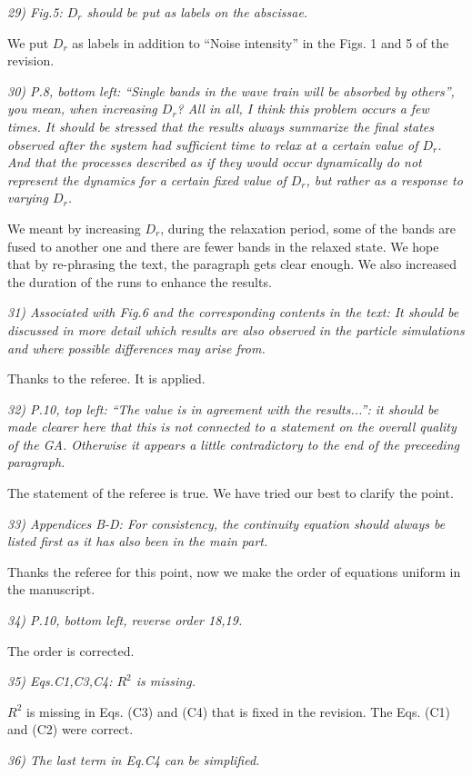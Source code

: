 \documentclass[a4paper,11pt]{letter}
\newcommand{\rf}[1]{\textit{\textcolor{hlcolor}{#1}}}
\begin{document}
\rf{29) Fig.5: $D_r$ should be put as labels on the abscissae.}

We put $D_r$ as labels in addition to ``Noise intensity'' in the Figs. 1 and 5 of the revision.

\rf{30) P.8, bottom left: ``Single bands in the wave train will be absorbed by others'', you mean, when increasing $D_r$? All in all, I think this problem occurs a few times. It should be stressed that the results always summarize the final states observed after the system had sufficient time to relax at a certain value of $D_r$. And that the processes described as if they would occur dynamically do not represent the dynamics for a certain fixed value of $D_r$, but rather as a response to varying $D_r$.}

We meant by increasing $D_r$, during the relaxation period, some of the bands are fused to another one and there are fewer bands in the relaxed state. We hope that by re-phrasing the text, the paragraph gets clear enough. We also increased the duration of the runs to enhance the results.

\rf{31) Associated with Fig.6 and the corresponding contents in the text: It should be discussed in more detail which results are also observed in the particle simulations and where possible differences may arise from.}

Thanks to the referee. It is applied.

\rf{32) P.10, top left: ``The value is in agreement with the results...'': it should be made clearer here that this is not connected to a statement on the overall quality of the GA. Otherwise it appears a little contradictory to the end of the preceeding paragraph.}

The statement of the referee is true.  We have tried our best to clarify the point.

\rf{33) Appendices B-D: For consistency, the continuity equation should
always be listed first as it has also been in the main part.}

Thanks the referee for this point, now we make the order of equations uniform in the manuscript.

\rf{34) P.10, bottom left, reverse order 18,19.}

The order is corrected.

\rf{35) Eqs.C1,C3,C4: $R^2$ is missing.}

$R^2$ is missing in Eqs. (C3) and (C4) that is fixed in the revision. The Eqs. (C1) and (C2) were correct. 

\rf{36) The last term in Eq.C4 can be simplified.}
\end{document}
